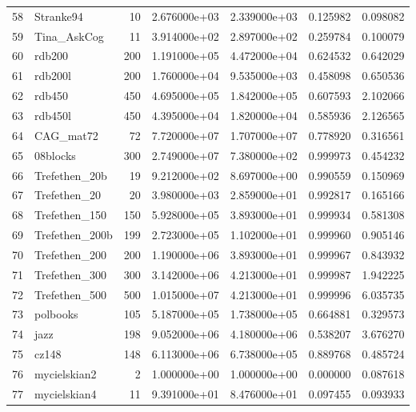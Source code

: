 \begin{tabular}{llrrrrr}
58 &           Stranke94 &    10 &  2.676000e+03 &  2.339000e+03 &  0.125982 &   0.098082 \\
59 &         Tina\_AskCog &    11 &  3.914000e+02 &  2.897000e+02 &  0.259784 &   0.100079 \\
60 &              rdb200 &   200 &  1.191000e+05 &  4.472000e+04 &  0.624532 &   0.642029 \\
61 &             rdb200l &   200 &  1.760000e+04 &  9.535000e+03 &  0.458098 &   0.650536 \\
62 &              rdb450 &   450 &  4.695000e+05 &  1.842000e+05 &  0.607593 &   2.102066 \\
63 &             rdb450l &   450 &  4.395000e+04 &  1.820000e+04 &  0.585936 &   2.126565 \\
64 &           CAG\_mat72 &    72 &  7.720000e+07 &  1.707000e+07 &  0.778920 &   0.316561 \\
65 &            08blocks &   300 &  2.749000e+07 &  7.380000e+02 &  0.999973 &   0.454232 \\
66 &       Trefethen\_20b &    19 &  9.212000e+02 &  8.697000e+00 &  0.990559 &   0.150969 \\
67 &        Trefethen\_20 &    20 &  3.980000e+03 &  2.859000e+01 &  0.992817 &   0.165166 \\
68 &       Trefethen\_150 &   150 &  5.928000e+05 &  3.893000e+01 &  0.999934 &   0.581308 \\
69 &      Trefethen\_200b &   199 &  2.723000e+05 &  1.102000e+01 &  0.999960 &   0.905146 \\
70 &       Trefethen\_200 &   200 &  1.190000e+06 &  3.893000e+01 &  0.999967 &   0.843932 \\
71 &       Trefethen\_300 &   300 &  3.142000e+06 &  4.213000e+01 &  0.999987 &   1.942225 \\
72 &       Trefethen\_500 &   500 &  1.015000e+07 &  4.213000e+01 &  0.999996 &   6.035735 \\
73 &            polbooks &   105 &  5.187000e+05 &  1.738000e+05 &  0.664881 &   0.329573 \\
74 &                jazz &   198 &  9.052000e+06 &  4.180000e+06 &  0.538207 &   3.676270 \\
75 &               cz148 &   148 &  6.113000e+06 &  6.738000e+05 &  0.889768 &   0.485724 \\
76 &        mycielskian2 &     2 &  1.000000e+00 &  1.000000e+00 &  0.000000 &   0.087618 \\
77 &        mycielskian4 &    11 &  9.391000e+01 &  8.476000e+01 &  0.097455 &   0.093933 \\

\end{tabular}
